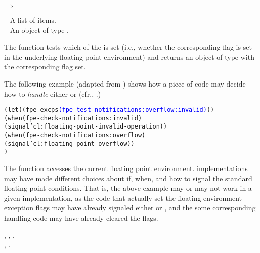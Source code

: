 \documentclass[../Exception-Handling.tex]{subfiles}
\begin{document}

\DSyntax{}

  
$\Rightarrow$ 

\DArgsNValues{}

 -- A list of  items.\\
 -- An object of type .

\DDescription{}

The function tests which of the  is set (i.e., whether
the corresponding flag is set in the underlying floating point
environment) and returns an object of type 
with the corresponding flag set.

\DExamples{}

The following example (adapted from \cite{2018:C18}) shows how a piece of
code may decide how to \emph{handle} either
 or
 (cfr., \cite{1996:ANSIHyperSpec}.)

\begin{alltt}
(let ((fpe-excps \textcolor{blue}{(fpe-test-notifications :overflow :invalid)}))
   (when (fpe-check-notifications :invalid)
     (signal 'cl:floating-point-invalid-operation))
   (when (fpe-check-notifications :overflow)
     (signal 'cl:floating-point-overflow))
   )
\end{alltt}

\DNotes{}

The  function accesses the current floating
point environment.  \CL{} implementations may have made different
choices about if, when, and how to signal the standard \CL{} floating
point conditions.  That is, the above example may or may not work in a
given \CL{} implementation, as the code that actually set the floating
environment exception flags may have already signaled either
 or
, and the some corresponding handling
code may have already cleared the flags.

\DSeeAlso{}

, ,
,\\
,
.
\end{document}
